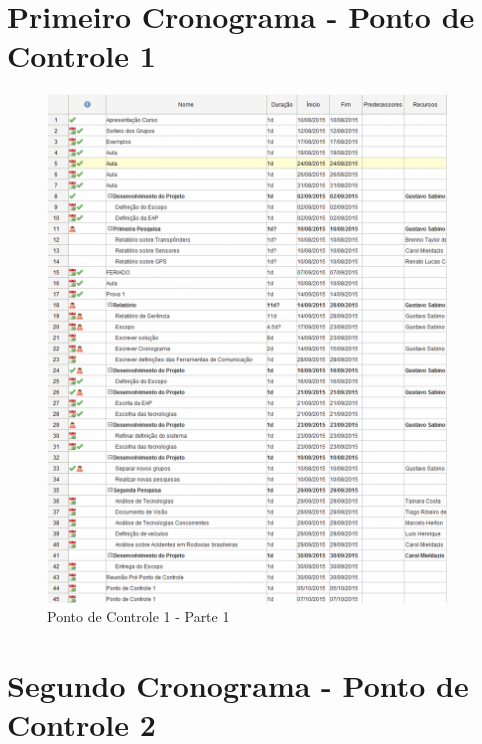 \begin{apendicesenv}

\partapendices

\chapter[Cronograma]{Primeiro Cronograma - Ponto de Controle 1}

\begin{figure}[h]
  \centering
  \includegraphics[width=400px, scale=1]{figuras/1cronograma}
  \caption{Ponto de Controle 1 - Parte 1}
\label{fig:1cronograma}
\end{figure}

\chapter[Cronograma]{Segundo Cronograma - Ponto de Controle 2}


\end{apendicesenv}
